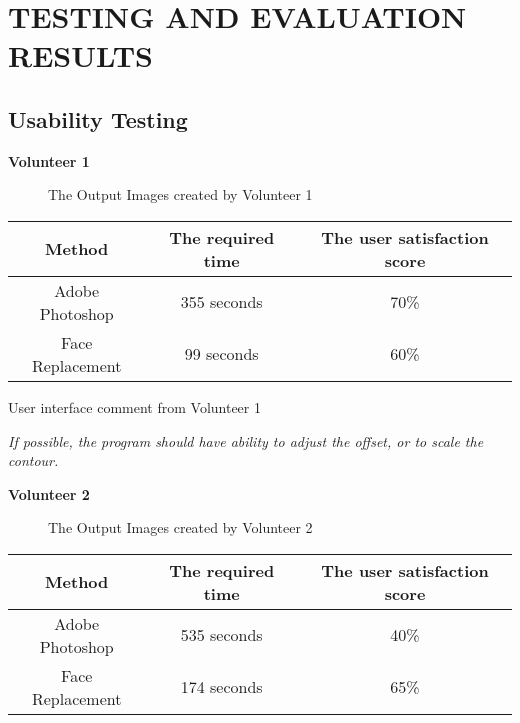 \chapter{TESTING AND EVALUATION RESULTS}

\section{Usability Testing}

\textbf{Volunteer 1}
\begin{figure}[htb]
  \centering
  \caption{The Output Images created by Volunteer 1}
  \label{fig:Result1}
\end{figure}

\begin{center}
\begin{tabular}{|c|c|c|}
  \hline
  Method & The required time & The user satisfaction score \\ \hline
  Adobe Photoshop & 355 seconds & 70\% \\ \hline
  Face Replacement & 99 seconds & 60\% \\
  \hline
\end{tabular}
\end{center}

\vspace{0.2in}\noindent User interface comment from Volunteer 1

\emph{If possible, the program should have ability to adjust the offset, or to scale the contour.}

\vspace{2.0in}\noindent \textbf{Volunteer 2}
\begin{figure}[htb]
  \centering
  \caption{The Output Images created by Volunteer 2}
  \label{fig:Result2}
\end{figure}

\begin{center}
\begin{tabular}{|c|c|c|}
  \hline
  Method & The required time & The user satisfaction score \\ \hline
  Adobe Photoshop & 535 seconds & 40\% \\ \hline
  Face Replacement & 174 seconds & 65\% \\
  \hline
\end{tabular}
\end{center}

